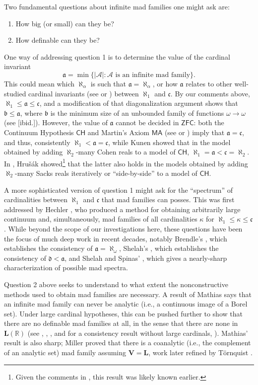 \documentclass[11pt]{amsart}
\newcommand{\R}{\mathbb{R}}
\newcommand{\LA}{\mathcal{A}}
\renewcommand{\b}{\mathfrak{b}}
\renewcommand{\d}{\mathfrak{d}}
\renewcommand{\a}{\mathfrak{a}}
\theoremstyle{definition}
\theoremstyle{remark}
\newcommand{\ZFC}{\mathsf{ZFC}}
\newcommand{\CH}{\mathsf{CH}}
\newcommand{\MA}{\mathsf{MA}}
\renewcommand{\1}{\mathbf{1}}
\newcommand{\V}{\mathbf{V}}
\renewcommand{\L}{\mathbf{L}}
\newcommand{\cc}{\mathfrak{c}}
\begin{document}
Two fundamental questions about infinite mad families one might ask are:
\begin{enumerate}[label=\textup{\arabic*.}]
	\item How big (or small) can they be?
	\item How definable can they be?	
\end{enumerate}

One way of addressing question 1 is to determine the value of the cardinal invariant
\[
	\a = \min\{|\LA|:\LA\text{ is an infinite mad family}\}.
\]
This could mean which $\aleph_\alpha$ is such that $\a=\aleph_\alpha$, or how $\a$ relates to other well-studied cardinal invariants (see \cite{MR2768685} or \cite{MR776622}) between $\aleph_1$ and $\cc$. By our comments above, $\aleph_1\leq\a\leq\cc$, and a modification of that diagonalization argument shows that $\b\leq\a$, where $\b$ is the minimum size of an unbounded family of functions $\omega\to\omega$ (see [ibid.]). However, the value of $\a$ cannot be decided in $\ZFC$: both the Continuum Hypothesis $\CH$ and Martin's Axiom $\MA$ (see \cite{MR597342} or \cite{MR0270904}) imply that $\a=\cc$, and thus, consistently $\aleph_1<\a=\cc$, while Kunen \cite{MR597342} showed that in the model obtained by adding $\aleph_2$-many Cohen reals to a model of $\CH$, $\aleph_1=\a<\cc=\aleph_2$. In \cite{MR1900391}, Hru\v{s}\'ak showed\footnote{Given the comments in \cite{MR1900391}, this result was likely known earlier.} that the latter also holds in the models obtained by adding $\aleph_2$-many Sacks reals iteratively or ``side-by-side'' to a model of $\CH$. 

A more sophisticated version of question 1 might ask for the ``spectrum'' of cardinalities between $\aleph_1$ and $\cc$ that mad families can posses. This was first addressed by Hechler \cite{MR0307913}, who produced a method for obtaining arbitrarily large continuum and, simultaneously, mad families of all cardinalities $\kappa$ for $\aleph_1\leq\kappa\leq\cc$. While beyond the scope of our investigations here, these questions have been the focus of much deep work in recent decades, notably Brendle's \cite{MR1975392}, which establishes the consistency of $\a=\aleph_\omega$, Shelah's \cite{MR2096454}, which establishes the consistency of $\d<\a$, and Shelah and Spinas' \cite{MR3395354}, which gives a nearly-sharp characterization of possible mad spectra.

Question 2 above seeks to understand to what extent the nonconstructive methods used to obtain mad families are necessary. A result of Mathias \cite{MR0491197} says that an infinite mad family can never be analytic (i.e., a continuous image of a Borel set). Under large cardinal hypotheses, this can be pushed further to show that there are no definable mad families at all, in the sense that there are none in $\L(\R)$ (see \cite{MR1644345}, \cite{MR0491197}, \cite{MR3787540}, and for a consistency result without large cardinals, \cite{Horowitz_Shelah_no_mad}). Mathias' result is also sharp; Miller \cite{MR983001} proved that there is a coanalytic (i.e., the complement of an analytic set) mad family assuming $\V=\L$, work later refined by T\"ornquist \cite{MR3156517}.
 
\end{document}
